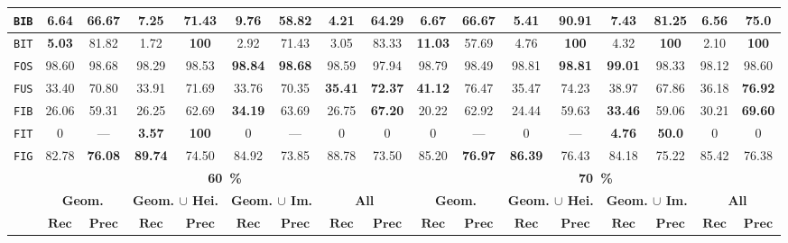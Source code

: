 \begin{sidewaystable}
\begin{center}
\begin{tabular}{|c | c c | c c | c c | c c || c c | c c | c c | c c |}
                    \texttt{BIB} & 6.64 & 66.67 & 7.25 & \textbf{71.43} & \textbf{9.76} & 58.82 & 4.21 & 64.29 & 6.67 & 66.67 & 5.41 & \textbf{90.91} & \textbf{7.43} & 81.25 & 6.56 & 75.0 \\
                    \hline
                    \texttt{BIT} & \textbf{5.03} & 81.82 & 1.72 & \textbf{100} & 2.92 & 71.43 & 3.05 & 83.33 & \textbf{11.03} & 57.69 & 4.76 & \textbf{100} & 4.32 & \textbf{100} & 2.10 & \textbf{100} \\
                    \hline
                    \texttt{FOS} & 98.60 & 98.68 & 98.29 & 98.53 & \textbf{98.84} & \textbf{98.68} & 98.59 & 97.94 & 98.79 & 98.49 & 98.81 & \textbf{98.81} & \textbf{99.01} & 98.33 & 98.12 & 98.60 \\
                    \hline
                    \texttt{FUS} & 33.40 & 70.80 & 33.91 & 71.69 & 33.76 & 70.35 & \textbf{35.41} & \textbf{72.37} & \textbf{41.12} & 76.47 & 35.47 & 74.23 & 38.97 & 67.86 & 36.18 & \textbf{76.92} \\
                    \hline
                    \texttt{FIB} & 26.06 & 59.31 & 26.25 & 62.69 & \textbf{34.19} & 63.69 & 26.75 & \textbf{67.20} & 20.22 & 62.92 & 24.44 & 59.63 & \textbf{33.46} & 59.06 & 30.21 & \textbf{69.60} \\
                    \hline
                    \texttt{FIT} & 0 & --- & \textbf{3.57} & \textbf{100} & 0 & --- & 0 & 0 & 0 & --- & 0 & --- & \textbf{4.76} & \textbf{50.0} & 0 & 0 \\
                    \hline
                    \texttt{FIG} & 82.78 & \textbf{76.08} & \textbf{89.74} & 74.50 & 84.92 & 73.85 & 88.78 & 73.50 & 85.20 & \textbf{76.97} & \textbf{86.39} & 76.43 & 84.18 & 75.22 & 85.42 & 76.38 \\
                    \hline
                    \hline
                    & \multicolumn{8}{c||}{\textbf{\SI{60}{\percent}}} & \multicolumn{8}{c|}{\textbf{\SI{70}{\percent}}}\\
                    \hline
                    &\multicolumn{2}{c|}{\textbf{Geom.}} & \multicolumn{2}{c|}{\textbf{Geom. $\cup$ Hei.}} & \multicolumn{2}{c|}{\textbf{Geom. $\cup$ Im.}} & \multicolumn{2}{c||}{\textbf{All}} & \multicolumn{2}{c|}{\textbf{Geom.}} & \multicolumn{2}{c|}{\textbf{Geom. $\cup$ Hei.}} & \multicolumn{2}{c|}{\textbf{Geom. $\cup$ Im.}} & \multicolumn{2}{x{1.5cm}|}{\textbf{All}}\\
                    \cline{2-17}
                    & \(\bm{Rec}\) & \(\bm{Prec}\) &  \(\bm{Rec}\) & \(\bm{Prec}\) &  \(\bm{Rec}\) & \(\bm{Prec}\) &  \(\bm{Rec}\) & \(\bm{Prec}\) & \(\bm{Rec}\) & \(\bm{Prec}\) &  \(\bm{Rec}\) & \(\bm{Prec}\) &  \(\bm{Rec}\) & \(\bm{Prec}\) &  \(\bm{Rec}\) & \(\bm{Prec}\) \\

\end{tabular}
\end{center}
\end{sidewaystable}
